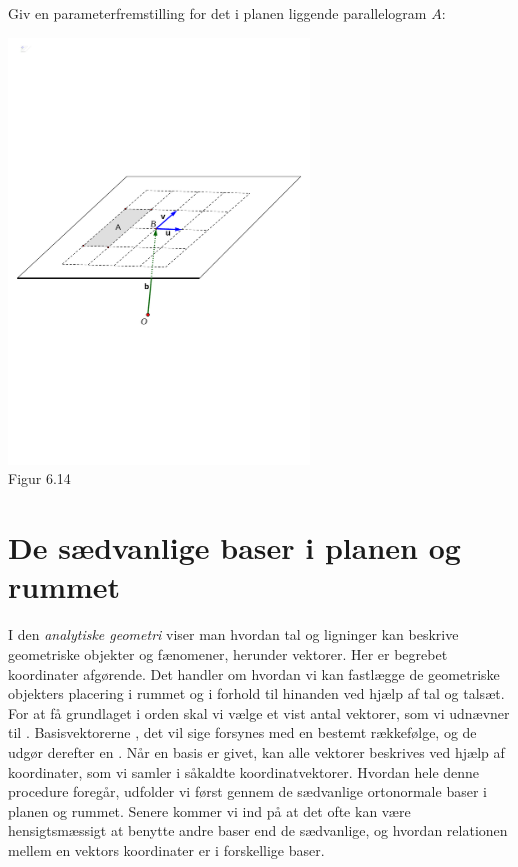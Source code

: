 \begin{exercise}
Giv en parameterfremstilling for det i planen liggende parallelogram $A$:
\begin{center}
		\includegraphics[trim=0.7cm 9cm 0.7cm
 9cm,width=0.60\textwidth,clip]{geometer/vektor16.pdf}		
   \\Figur 6.14
\end{center}
\end{exercise}
\section{De sædvanlige baser i planen og rummet}
I den \textit{analytiske geometri} viser man hvordan tal og ligninger kan beskrive geometriske objekter og fænomener, herunder vektorer. Her er begrebet koordinater afgørende. Det handler om hvordan vi kan fastlægge de geometriske objekters placering i rummet og i forhold til hinanden ved hjælp af tal og talsæt. For at få grundlaget i orden skal vi vælge et vist antal vektorer, som vi udnævner til . Basisvektorerne , det vil sige forsynes med en bestemt rækkefølge, og de udgør derefter en . Når en basis er givet, kan alle vektorer beskrives ved hjælp af koordinater, som vi samler i såkaldte koordinatvektorer. Hvordan hele denne procedure foregår, udfolder vi først gennem de sædvanlige ortonormale baser i planen og rummet. Senere kommer vi ind på at det ofte kan være hensigtsmæssigt at benytte andre baser end de sædvanlige, og hvordan relationen mellem en vektors koordinater er i forskellige baser.

